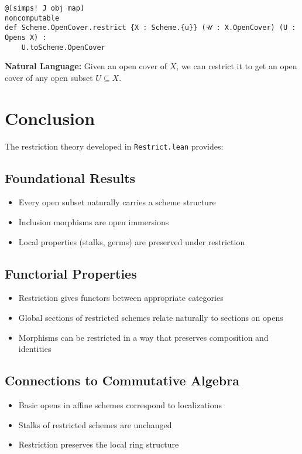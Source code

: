 \documentclass{article}
\theoremstyle{definition}
\begin{document}
\begin{lstlisting}
@[simps! J obj map]
noncomputable
def Scheme.OpenCover.restrict {X : Scheme.{u}} (𝒰 : X.OpenCover) (U : Opens X) :
    U.toScheme.OpenCover
\end{lstlisting}

\textbf{Natural Language:} Given an open cover of $X$, we can restrict it to get an open cover of any open subset $U \subseteq X$.

\section{Conclusion}

The restriction theory developed in \texttt{Restrict.lean} provides:

\subsection{Foundational Results}
\begin{itemize}
\item Every open subset naturally carries a scheme structure
\item Inclusion morphisms are open immersions
\item Local properties (stalks, germs) are preserved under restriction
\end{itemize}

\subsection{Functorial Properties}
\begin{itemize}
\item Restriction gives functors between appropriate categories
\item Global sections of restricted schemes relate naturally to sections on opens
\item Morphisms can be restricted in a way that preserves composition and identities
\end{itemize}

\subsection{Connections to Commutative Algebra}
\begin{itemize}
\item Basic opens in affine schemes correspond to localizations
\item Stalks of restricted schemes are unchanged
\item Restriction preserves the local ring structure
\end{itemize}
\end{document}
